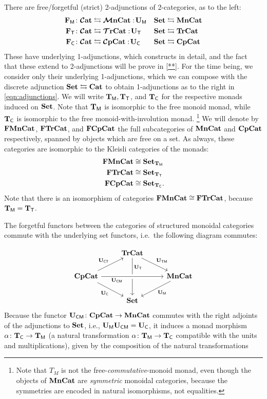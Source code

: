 \documentclass[11pt,oneside,article]{memoir}
\begin{document}
There are free/forgetful (strict) 2-adjunctions of 2-categories, as to the left:
\begin{align}
\nonumber
		\mathbf{F}_{\mathsf{M}}\colon\bm{\mathcal{C}}\mathbf{at} &\leftrightarrows\bm{\mathcal{M}}\mathbf{nCat}:\!\mathbf{U}_{\mathsf{M}}
			& \mathbf{Set} &\leftrightarrows\mathbf{MnCat}
\\\label{eqn:adjunctions}
		\mathbf{F}_{\mathsf{T}}\colon\bm{\mathcal{C}}\mathbf{at} &\leftrightarrows\bm{\mathcal{T}}\mathbf{rCat}:\!\mathbf{U}_{\mathsf{T}}
			& \mathbf{Set} &\leftrightarrows\mathbf{TrCat}
\\\nonumber
		\mathbf{F}_{\mathsf{C}}\colon\bm{\mathcal{C}}\mathbf{at} &\leftrightarrows\bm{\mathcal{C}}\mathbf{pCat}:\!\mathbf{U}_{\mathsf{C}}
			& \mathbf{Set}&\leftrightarrows\mathbf{CpCat}
\end{align}
These have underlying 1-adjunctions, which \cite{Abramsky2} constructs in detail, and the fact that these extend to 2-adjunctions will be prove in \ref{**}. For the time being, we consider only their underlying 1-adjunctions, which we can compose with the discrete adjunction $\mathbf{Set}\leftrightarrows\mathbf{Cat}$ to obtain 1-adjunctions as to the right in \eqref{eqn:adjunctions}. We will write $\mathbf{T}_{\mathsf{M}}, \mathbf{T}_{\mathsf{T}}$, and $\mathbf{T}_{\mathsf{C}}$ for the respective monads induced on $\mathbf{Set}$. Note that $\mathbf{T}_{\mathsf{M}}$ is
isomorphic to the free monoid monad, while $\mathbf{T}_{\mathsf{C}}$ is isomorphic to the free monoid-with-involution monad.%
\footnote{
   Note that $T_M$ is not the free-\emph{commutative}-monoid monad, even though the objects of
   $\mathbf{MnCat}$ are \emph{symmetric} monoidal categories, because the symmetries are encoded in natural
   isomorphisms, not equalities.
}
We will denote by $\mathbf{FMnCat}$, $\mathbf{FTrCat}$, and $\mathbf{FCpCat}$ the full subcategories of $\mathbf{MnCat}$ and $\mathbf{CpCat}$
respectively, spanned by objects which are free on a set. As always, these categories are isomorphic
to the Kleisli categories of the monads:
\begin{align}
\nonumber
\mathbf{FMnCat}&\cong\mathbf{Set}_{\mathbf{T}_{\mathsf{M}}}
\\\label{dia:TMvsFrMonCat}
\mathbf{FTrCat}&\cong\mathbf{Set}_{\mathbf{T}_{\mathsf{T}}}
\\\nonumber
\mathbf{FCpCat}&\cong\mathbf{Set}_{\mathbf{T}_{\mathsf{C}}}.
\end{align}
Note that there is an isomorphism of categories $\mathbf{FMnCat}\cong\mathbf{FTrCat}$, because $\mathbf{T}_{\mathsf{M}}=\mathbf{T}_{\mathsf{T}}$.

The forgetful functors between the categories of structured monoidal categories commute with the
underlying set functors, i.e.~the following diagram commutes:

\begin{equation}\label{eqn:tetrahedron}
   \begin{tikzcd}
      & \TrCat \ar[dr,"\UTM"] \ar[dd,"\UT" near start] & \\
      \CompCat \ar[rr,crossing over,"\UCM"' near start] \ar[dr,"\UC"'] \ar[ru,"\UCT"]
         && \MonCat \ar[dl,"\UM"] \\
      & \Set &
   \end{tikzcd}
\end{equation}
Because the functor $\mathbf{U}_{\mathsf{CM}}\colon\mathbf{CpCat}\to\mathbf{MnCat}$ commutes with the right adjoints of the
adjunctions to $\mathbf{Set}$, i.e., $\mathbf{U}_{\mathsf{M}}\mathbf{U}_{\mathsf{CM}}=\mathbf{U}_{\mathsf{C}}$, it induces a monad morphism $\alpha\colon\mathbf{T}_{\mathsf{C}}\to\mathbf{T}_{\mathsf{M}}$ (a natural transformation
$\alpha\colon\mathbf{T}_{\mathsf{M}}\to\mathbf{T}_{\mathsf{C}}$ compatible with the units and multiplications), given by the composition of
the natural transformations
\end{document}
